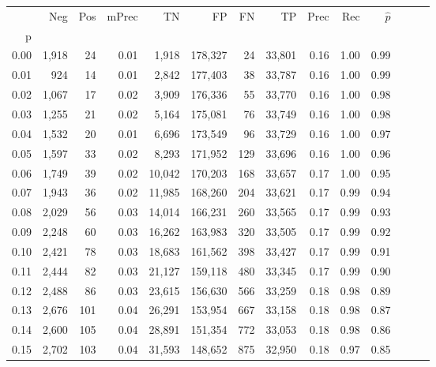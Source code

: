 \begin{tabular}{rrrrrrrrrrrrrr}
\toprule
{} &    Neg &  Pos & mPrec &       TN &       FP &      FN &      TP &  Prec &   Rec & $\hat{p}$ \\
p    &        &      &       &          &          &         &         &       &       &           \\
\midrule
0.00 &  1,918 &   24 &  0.01 &    1,918 &  178,327 &      24 &  33,801 &  0.16 &  1.00 &      0.99 \\
0.01 &    924 &   14 &  0.01 &    2,842 &  177,403 &      38 &  33,787 &  0.16 &  1.00 &      0.99 \\
0.02 &  1,067 &   17 &  0.02 &    3,909 &  176,336 &      55 &  33,770 &  0.16 &  1.00 &      0.98 \\
0.03 &  1,255 &   21 &  0.02 &    5,164 &  175,081 &      76 &  33,749 &  0.16 &  1.00 &      0.98 \\
0.04 &  1,532 &   20 &  0.01 &    6,696 &  173,549 &      96 &  33,729 &  0.16 &  1.00 &      0.97 \\
0.05 &  1,597 &   33 &  0.02 &    8,293 &  171,952 &     129 &  33,696 &  0.16 &  1.00 &      0.96 \\
0.06 &  1,749 &   39 &  0.02 &   10,042 &  170,203 &     168 &  33,657 &  0.17 &  1.00 &      0.95 \\
0.07 &  1,943 &   36 &  0.02 &   11,985 &  168,260 &     204 &  33,621 &  0.17 &  0.99 &      0.94 \\
0.08 &  2,029 &   56 &  0.03 &   14,014 &  166,231 &     260 &  33,565 &  0.17 &  0.99 &      0.93 \\
0.09 &  2,248 &   60 &  0.03 &   16,262 &  163,983 &     320 &  33,505 &  0.17 &  0.99 &      0.92 \\
0.10 &  2,421 &   78 &  0.03 &   18,683 &  161,562 &     398 &  33,427 &  0.17 &  0.99 &      0.91 \\
0.11 &  2,444 &   82 &  0.03 &   21,127 &  159,118 &     480 &  33,345 &  0.17 &  0.99 &      0.90 \\
0.12 &  2,488 &   86 &  0.03 &   23,615 &  156,630 &     566 &  33,259 &  0.18 &  0.98 &      0.89 \\
0.13 &  2,676 &  101 &  0.04 &   26,291 &  153,954 &     667 &  33,158 &  0.18 &  0.98 &      0.87 \\
0.14 &  2,600 &  105 &  0.04 &   28,891 &  151,354 &     772 &  33,053 &  0.18 &  0.98 &      0.86 \\
0.15 &  2,702 &  103 &  0.04 &   31,593 &  148,652 &     875 &  32,950 &  0.18 &  0.97 &      0.85 \\

\end{tabular}
